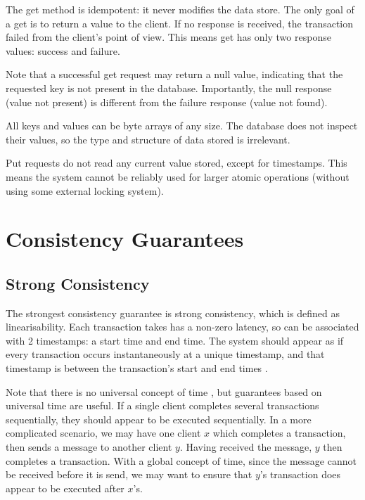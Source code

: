 \documentclass[12pt,a4paper,twoside,openright]{report}
\begin{document}
The get method is idempotent: it never modifies the data store. The only goal of a get is to return a value to the client. If no response is received, the transaction failed from the client's point of view. This means get has only two response values: success and failure.

Note that a successful get request may return a null value, indicating that the requested key is not present in the database. Importantly, the null response (value not present) is different from the failure response (value not found).

All keys and values can be byte arrays of any size. The database does not inspect their values, so the type and structure of data stored is irrelevant.

Put requests do not read any current value stored, except for timestamps. This means the system cannot be reliably used for larger atomic operations (without using some external locking system). %


\section{Consistency Guarantees}

\subsection*{Strong Consistency}

The strongest consistency guarantee is strong consistency, which is defined as linearisability. Each transaction takes has a non-zero latency, so can be associated with 2 timestamps: a start time and end time. The system should appear as if every transaction occurs instantaneously at a unique timestamp, and that timestamp is between the transaction's start and end times \cite{herlihy1990linearizability}.

Note that there is no universal concept of time \cite{bacon2003operating}, but guarantees based on universal time are useful. If a single client completes several transactions sequentially, they should appear to be executed sequentially. In a more complicated scenario, we may have one client $x$ which completes a transaction, then sends a message to another client $y$. Having received the message, $y$ then completes a transaction. With a global concept of time, since the message cannot be received before it is send, we may want to ensure that $y$'s transaction does appear to be executed after $x$'s.
\end{document}
